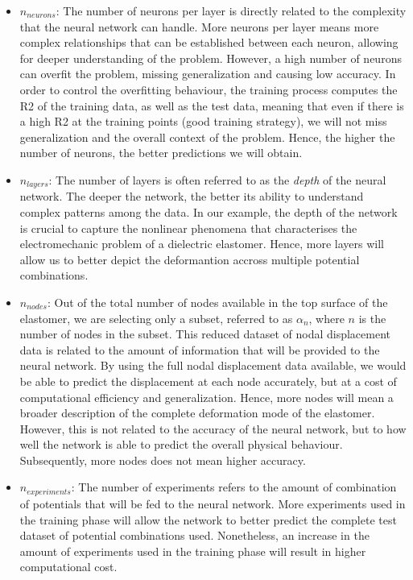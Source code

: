 \begin{itemize}
  \item $n_{neurons}$: The number of neurons per layer is directly related to the complexity that the neural network can handle. More neurons per layer means more complex relationships that can be established between each neuron, allowing for deeper understanding of the problem. However, a high number of neurons can overfit the problem, missing generalization and causing low accuracy. In order to control the overfitting behaviour, the training process computes the R2 of the training data, as well as the test data, meaning that even if there is a high R2 at the training points (good training strategy), we will not miss generalization and the overall context of the problem. Hence, the higher the number of neurons, the better predictions we will obtain. 
  \item  $n_{layers}$: The number of layers is often referred to as the \textit{depth} of the neural network. The deeper the network, the better its ability to understand complex patterns among the data. In our example, the depth of the network is crucial to capture the nonlinear phenomena that characterises the electromechanic problem of a dielectric elastomer. Hence, more layers will allow us to better depict the deformantion accross multiple potential combinations.
  \item $n_{nodes}$: Out of the total number of nodes available in the top surface of the elastomer, we are selecting only a subset, referred to as $\alpha_n$, where $n$ is the number of nodes in the subset. This reduced dataset of nodal displacement data is related to the amount of information that will be provided to the neural network. By using the full nodal displacement data available, we would be able to predict the displacement at each node accurately, but at a cost of computational efficiency and generalization. Hence, more nodes will mean a broader description of the complete deformation mode of the elastomer. However, this is not related to the accuracy of the neural network, but to how well the network is able to predict the overall physical behaviour. Subsequently, more nodes does not mean higher accuracy.
  \item  $n_{experiments}$: The number of experiments refers to the amount of combination of potentials that will be fed to the neural network. More experiments used in the training phase will allow the network to better predict the complete test dataset of potential combinations used. Nonetheless, an increase in the amount of experiments used in the training phase will result in higher computational cost. 
\end{itemize}

